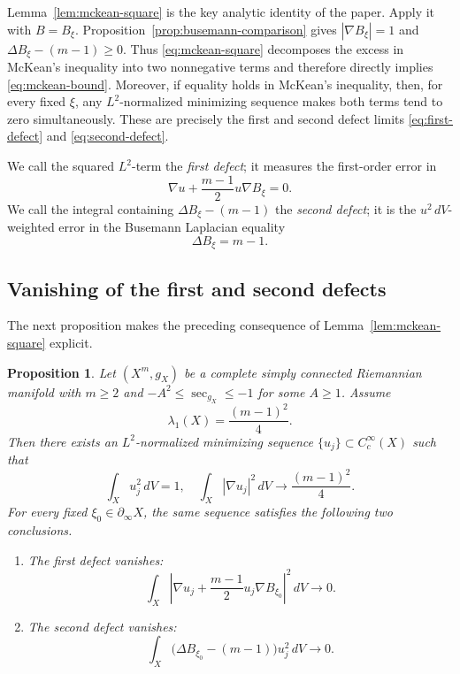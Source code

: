 \documentclass[12pt]{amsart}
\newtheorem{proposition}[theorem]{Proposition}
\theoremstyle{definition}
\numberwithin{equation}{section}
\begin{document}
Lemma~\ref{lem:mckean-square} is the key analytic identity of the paper.
Apply it with \(B=B_\xi\).  Proposition~\ref{prop:busemann-comparison}
gives \(|\nabla B_\xi|=1\) and
\(\Delta B_\xi-(m-1)\geq0\).  Thus
\eqref{eq:mckean-square} decomposes the excess in McKean's inequality into
two nonnegative terms and therefore directly implies
\eqref{eq:mckean-bound}.  Moreover, if equality holds in McKean's
inequality, then, for every fixed \(\xi\), any \(L^2\)-normalized
minimizing sequence makes both terms tend to zero simultaneously.  These
are precisely the first and second defect limits
\eqref{eq:first-defect} and \eqref{eq:second-defect}.

We call the squared \(L^2\)-term the \emph{first defect}; it measures the
first-order error in
\[
  \nabla u+\frac{m-1}{2}u\nabla B_\xi=0.
\]
We call the integral containing
\(\Delta B_\xi-(m-1)\) the \emph{second defect}; it is the
\(u^2\,dV\)-weighted error in the Busemann Laplacian equality
\[
  \Delta B_\xi=m-1.
\]

\subsection{Vanishing of the first and second defects}

The next proposition makes the preceding consequence of
Lemma~\ref{lem:mckean-square} explicit.

\begin{proposition}
\label{prop:defects}
Let \((X^m,g_X)\) be a complete simply connected Riemannian manifold with
\(m\geq2\) and \(-A^2\leq\sec_{g_X}\leq-1\) for some \(A\geq1\).  Assume
\[
  \lambda_1(X)=\frac{(m-1)^2}{4}.
\]
Then there exists an \(L^2\)-normalized minimizing sequence
\(\{u_j\}\subset C_c^\infty(X)\) such that
\begin{equation}\label{eq:minimizing-sequence}
  \int_Xu_j^2\,dV=1,
  \quad
  \int_X|\nabla u_j|^2\,dV
  \longrightarrow\frac{(m-1)^2}{4}.
\end{equation}
For every fixed \(\xi_0\in\partial_\infty X\), the same sequence satisfies
the following two conclusions.
\begin{enumerate}[label=\textup{(\roman*)}]
\item The first defect vanishes:
\begin{equation}\label{eq:first-defect}
  \int_X\left|
    \nabla u_j+\frac{m-1}{2}u_j\nabla B_{\xi_0}
  \right|^2\,dV\longrightarrow0.
\end{equation}
\item The second defect vanishes:
\begin{equation}\label{eq:second-defect}
  \int_X\bigl(\Delta B_{\xi_0}-(m-1)\bigr)u_j^2\,dV
  \longrightarrow0.
\end{equation}
\end{enumerate}
\end{proposition}
\end{document}
